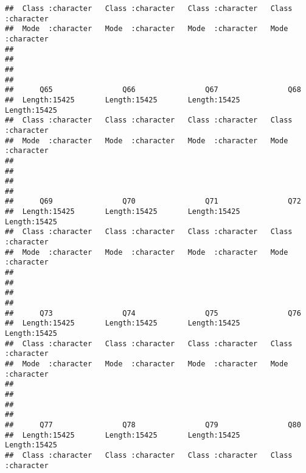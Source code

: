 \documentclass[
]{article}
\begin{document}
\begin{verbatim}
##  Class :character   Class :character   Class :character   Class :character  
##  Mode  :character   Mode  :character   Mode  :character   Mode  :character  
##                                                                             
##                                                                             
##                                                                             
##                                                                             
##      Q65                Q66                Q67                Q68           
##  Length:15425       Length:15425       Length:15425       Length:15425      
##  Class :character   Class :character   Class :character   Class :character  
##  Mode  :character   Mode  :character   Mode  :character   Mode  :character  
##                                                                             
##                                                                             
##                                                                             
##                                                                             
##      Q69                Q70                Q71                Q72           
##  Length:15425       Length:15425       Length:15425       Length:15425      
##  Class :character   Class :character   Class :character   Class :character  
##  Mode  :character   Mode  :character   Mode  :character   Mode  :character  
##                                                                             
##                                                                             
##                                                                             
##                                                                             
##      Q73                Q74                Q75                Q76           
##  Length:15425       Length:15425       Length:15425       Length:15425      
##  Class :character   Class :character   Class :character   Class :character  
##  Mode  :character   Mode  :character   Mode  :character   Mode  :character  
##                                                                             
##                                                                             
##                                                                             
##                                                                             
##      Q77                Q78                Q79                Q80           
##  Length:15425       Length:15425       Length:15425       Length:15425      
##  Class :character   Class :character   Class :character   Class :character  

\end{verbatim}
\end{document}
